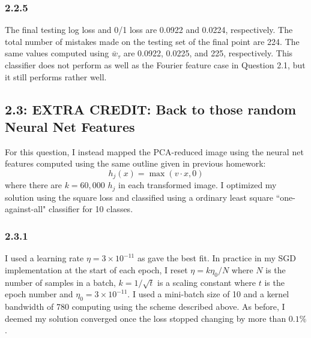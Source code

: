 \documentclass[12pt]{amsart}
\begin{document}
\subsubsection*{2.2.5}
The final testing log loss and 0/1 loss are 0.0922 and 0.0224, respectively.  The total number of mistakes made on the testing set of the final point are 224.  The same values computed using $\bar{w}_{\tau}$ are 0.0922, 0.0225, and 225, respectively.  This classifier does not perform as well as the Fourier feature case in Question 2.1, but it still performs rather well.

\subsection*{2.3: EXTRA CREDIT: Back to those random Neural Net Features}
For this question, I instead mapped the PCA-reduced image using the neural net features computed using the same outline given in previous homework:
\begin{equation}
h_j(x) = \max(v \cdot x, 0)
\end{equation}
where there are $k = 60,000$ $h_j$ in each transformed image.  I optimized my solution using the square loss and classified using a ordinary least square ``one-against-all" classifier for 10 classes.

\subsubsection*{2.3.1}
I used a learning rate $\eta = 3 \times 10^{-11}$ as gave the best fit.  In practice in my SGD implementation at the start of each epoch, I reset $\eta = k\eta_0/N$ where $N$ is the number of samples in a batch, $k = 1/\sqrt{t}$ is a scaling constant where $t$ is the epoch number and $\eta_0 = 3 \times 10^{-11}$.  I used a mini-batch size of 10 and a kernel bandwidth of 780 computing using the scheme described above.   As before, I deemed my solution converged once the loss stopped changing by more than $0.1\%$.
\end{document}
